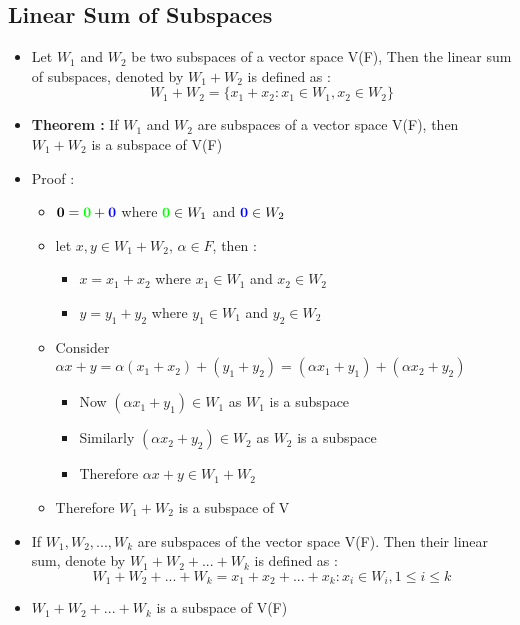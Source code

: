 \documentclass[twoside]{article}
\begin{document}
	\subsection{Linear Sum of Subspaces}
	\begin{itemize}
		\item Let $W_1$ and $W_2$ be two subspaces of a vector space V(F), Then the linear sum of subspaces, denoted by $W_1 + W_2$ is defined as :
		\[W_1 + W_2 = \{x_1 + x_2 : x_1 \in W_1, x_2 \in W_2\}\]
		\item {\bf Theorem :} If $W_1$ and $W_2$ are subspaces of a vector space V(F), then $W_1 + W_2$ is a subspace of V(F)
		\item Proof :
			\begin{itemize}
				\item $\mathbf{0} = {\color{green} \mathbf{0}} + {\color{blue} \mathbf{0}}$ where ${\color{green} \mathbf{0}} \in W_1$ and ${\color{blue}\mathbf{0}} \in W_2$
				\item let $x, y \in W_1 + W_2 \text{, } \alpha \in F$, then :
					\begin{itemize}
						\item $x = x_1 + x_2$ where $x_1 \in W_1$ and $x_2 \in W_2$
						\item $y = y_1 + y_2$ where $y_1 \in W_1$ and $y_2 \in W_2$
					\end{itemize}
				\item Consider $\alpha x + y = \alpha (x_1 + x_2) + (y_1 + y_2) = (\alpha x_1 + y_1) + (\alpha x_2 + y_2)$
					\begin{itemize}
						\item Now $(\alpha x_1 + y_1) \in W_1$ as $W_1$ is a subspace 
						\item Similarly $(\alpha x_2 + y_2) \in W_2$ as $W_2$ is a subspace
						\item Therefore $\alpha x + y \in W_1 + W_2$ 
					\end{itemize}
				\item Therefore $W_1 + W_2$ is a subspace of V
			\end{itemize}
		\item If $W_1, W_2, ..., W_k$ are subspaces of the vector space V(F). Then their linear sum, denote by $W_1 + W_2 + ... + W_k$ is defined as :
		\[W_1 + W_2 + ... + W_k = {x_1 + x_2 + ... + x_k : x_i \in W_i, 1 \leq i \leq k}\]
		\item $W_1 + W_2 + ... + W_k$ is a subspace of V(F)
	\end{itemize}
\end{document}
